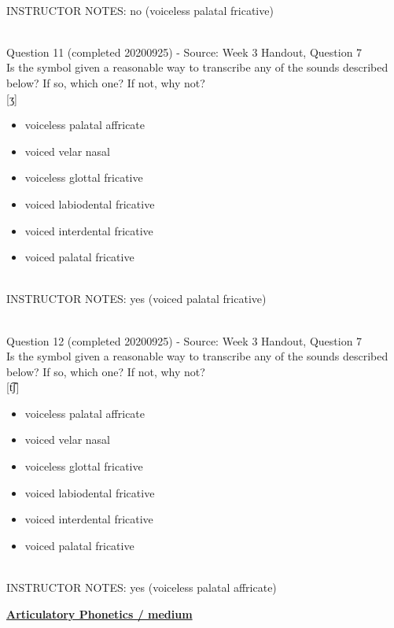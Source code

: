 \documentclass[12pt]{article}
\begin{document}
~\\
INSTRUCTOR NOTES: no (voiceless palatal fricative)


~\\

{\large Question 11} (completed 20200925) - Source: Week 3 Handout, Question 7\\

Is the symbol given a reasonable way to transcribe any of the sounds described below? If so, which one? If not, why not?\\

{[ʒ]}

\begin{itemize} \item voiceless palatal affricate \item voiced velar nasal \item voiceless glottal fricative \item voiced labiodental fricative \item voiced interdental fricative \item voiced palatal fricative \end{itemize}


~\\
INSTRUCTOR NOTES: yes (voiced palatal fricative)


~\\

{\large Question 12} (completed 20200925) - Source: Week 3 Handout, Question 7\\

Is the symbol given a reasonable way to transcribe any of the sounds described below? If so, which one? If not, why not?\\

{[t͡ʃ]}

\begin{itemize} \item voiceless palatal affricate \item voiced velar nasal \item voiceless glottal fricative \item voiced labiodental fricative \item voiced interdental fricative \item voiced palatal fricative \end{itemize}


~\\
INSTRUCTOR NOTES: yes (voiceless palatal affricate)


\newpage\textbf{\underline{\huge Articulatory Phonetics / medium\\}}
\end{document}
